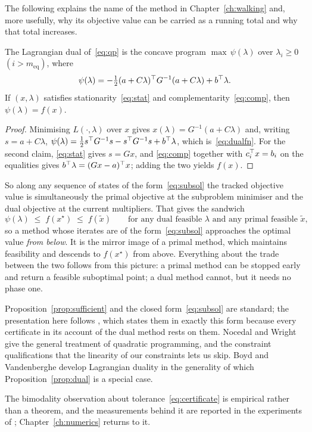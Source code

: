 The following explains the name of the method in Chapter~\ref{ch:walking} and,
more usefully, why its objective value can be carried as a running total and why
that total increases.

\begin{proposition}
\label{prop:dual}
The Lagrangian dual of~\eqref{eq:qp} is the concave program $\max\,\psi(\lambda)$
over $\lambda_i \ge 0$ $(i > m_{\mathrm{eq}})$, where
\begin{equation}
  \psi(\lambda) = -\tfrac12 (a + C\lambda)^{\top} G^{-1} (a + C\lambda) + b^{\top}\lambda .
  \label{eq:dualfn}
\end{equation}
If $(x,\lambda)$ satisfies stationarity~\eqref{eq:stat} and
complementarity~\eqref{eq:comp}, then $\psi(\lambda) = f(x)$.
\end{proposition}

\begin{proof}
Minimising $L(\cdot,\lambda)$ over $x$ gives $x(\lambda) = G^{-1}(a + C\lambda)$
and, writing $s = a + C\lambda$,
$\psi(\lambda) = \tfrac12 s^{\top} G^{-1}s - s^{\top} G^{-1}s + b^{\top}\lambda$, which
is~\eqref{eq:dualfn}. For the second claim, \eqref{eq:stat} gives $s = Gx$, and
\eqref{eq:comp} together with $c_i^{\top} x = b_i$ on the equalities gives
$b^{\top}\lambda = (Gx - a)^{\top} x$; adding the two yields $f(x)$.
\end{proof}

So along any sequence of states of the form~\eqref{eq:subsol} the tracked
objective value is simultaneously the primal objective at the subproblem
minimiser and the dual objective at the current multipliers. That gives the
sandwich
\[
  \psi(\lambda) \;\le\; f(x^\star) \;\le\; f(\tilde x)
  \qquad\text{for any dual feasible $\lambda$ and any primal feasible $\tilde x$,}
\]
so a method whose iterates are of the form~\eqref{eq:subsol} approaches the
optimal value \emph{from below}. It is the mirror image of a primal method, which
maintains feasibility and descends to $f(x^\star)$ from above. Everything about
the trade between the two follows from this picture: a primal method can be
stopped early and return a feasible suboptimal point; a dual method cannot, but
it needs no phase one.

\begin{notes}
Proposition~\ref{prop:sufficient} and the closed form~\eqref{eq:subsol} are
standard; the presentation here follows \cite{schmelzer2026quadprog}, which states
them in exactly this form because every certificate in its account of the dual method
rests on them. Nocedal and Wright \cite[Ch.~16]{nocedal2006} give
the general treatment of quadratic programming, and \cite[Ch.~12]{nocedal2006} the
constraint qualifications that the linearity of our constraints lets us skip.
Boyd and Vandenberghe \cite{boyd2004} develop Lagrangian duality in the generality
of which Proposition~\ref{prop:dual} is a special case.

The bimodality observation about tolerance~\eqref{eq:certificate} is empirical
rather than a theorem, and the measurements behind it are reported in the
experiments of \cite{schmelzer2026quadprog}; Chapter~\ref{ch:numerics} returns to it.
\end{notes}

